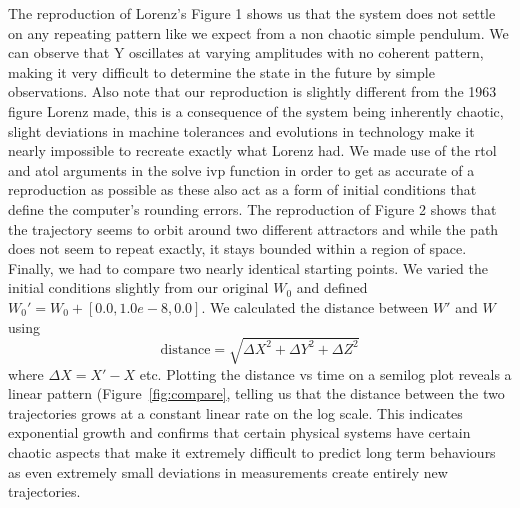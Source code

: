 \documentclass[10pt, preprint]{aastex}
\begin{document}
The reproduction of Lorenz's Figure 1 shows us that the system does not settle on any repeating pattern like we expect from a non chaotic simple pendulum. We can observe that Y oscillates at varying amplitudes with no coherent pattern, making it very difficult to determine the state in the future by simple observations. Also note that our reproduction is slightly different from the 1963 figure Lorenz made, this is a consequence of the system being inherently chaotic, slight deviations in machine tolerances and evolutions in technology make it nearly impossible to recreate exactly what Lorenz had. We made use of the rtol and atol arguments in the solve ivp function in order to get as accurate of a reproduction as possible as these also act as a form of initial conditions that define the computer's rounding errors.  
The reproduction of Figure 2 shows that the trajectory seems to orbit around two different attractors and while the path does not seem to repeat exactly, it stays bounded within a region of space. 
Finally, we had to compare two nearly identical starting points. We varied the initial conditions slightly from our original $W_0$ and defined $W_0'=W_0+[0.0, 1.0e-8, 0.0]$. We calculated the distance between $W'$ and $W$ using
\begin{equation}
    \text{distance}= \sqrt{\Delta X^2+\Delta Y^2+\Delta Z^2}
\end{equation}
where $\Delta X = X'-X$ etc. 
Plotting the distance vs time on a semilog plot reveals a linear pattern (Figure~\ref{fig:compare}, telling us that the distance between the two trajectories grows at a constant linear rate on the log scale. This indicates exponential growth and confirms that certain physical systems have certain chaotic aspects that make it extremely difficult to predict long term behaviours as even extremely small deviations in measurements create entirely new trajectories. 
\end{document}
